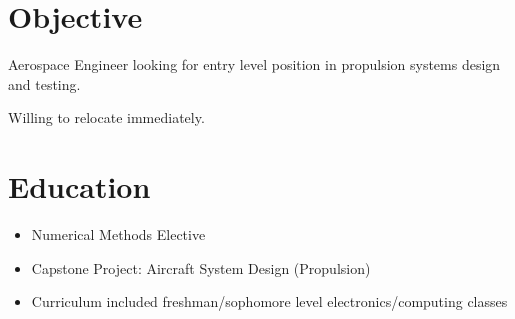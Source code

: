 \documentclass[11pt]{moderncv}
\begin{document}
\makecvtitle

\section{Objective}
Aerospace Engineer looking for entry level position in propulsion systems design and testing.

Willing to relocate immediately.
\section{Education}
\begin{itemize}
\item Numerical Methods Elective
\item Capstone Project: Aircraft System Design (Propulsion)
\item Curriculum included freshman/sophomore level electronics/computing classes
\end{itemize}
\end{document}
